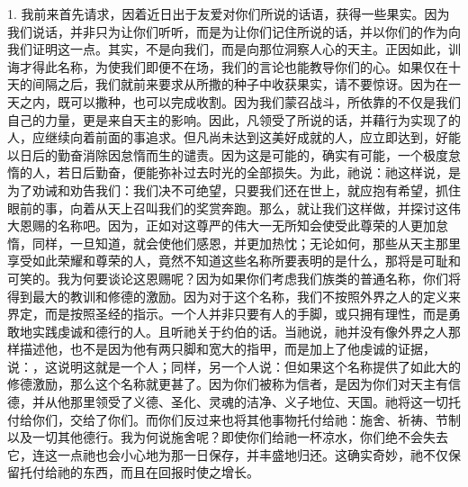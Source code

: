 1. 我前来首先请求，因着近日出于友爱对你们所说的话语，获得一些果实。因为我们说话，并非只为让你们听听，而是为让你们记住所说的话，并以你们的作为向我们证明这一点。其实，不是向我们，而是向那位洞察人心的天主。正因如此，训诲才得此名称，为使我们即便不在场，我们的言论也能教导你们的心。如果仅在十天的间隔之后，我们就前来要求从所撒的种子中收获果实，请不要惊讶。因为在一天之内，既可以撒种，也可以完成收割。因为我们蒙召战斗，所依靠的不仅是我们自己的力量，更是来自天主的影响。因此，凡领受了所说的话，并藉行为实现了的人，应继续向着前面的事追求。但凡尚未达到这美好成就的人，应立即达到，好能以日后的勤奋消除因怠惰而生的谴责。因为这是可能的，确实有可能，一个极度怠惰的人，若日后勤奋，便能弥补过去时光的全部损失。为此，祂说：祂这样说，是为了劝诫和劝告我们：我们决不可绝望，只要我们还在世上，就应抱有希望，抓住眼前的事，向着从天上召叫我们的奖赏奔跑。那么，就让我们这样做，并探讨这伟大恩赐的名称吧。因为，正如对这尊严的伟大一无所知会使受此尊荣的人更加怠惰，同样，一旦知道，就会使他们感恩，并更加热忱；无论如何，那些从天主那里享受如此荣耀和尊荣的人，竟然不知道这些名称所要表明的是什么，那将是可耻和可笑的。我为何要谈论这恩赐呢？因为如果你们考虑我们族类的普通名称，你们将得到最大的教训和修德的激励。因为对于这个名称，我们不按照外界之人的定义来界定，而是按照圣经的指示。一个人并非只要有人的手脚，或只拥有理性，而是勇敢地实践虔诚和德行的人。且听祂关于约伯的话。当祂说，祂并没有像外界之人那样描述他，也不是因为他有两只脚和宽大的指甲，而是加上了他虔诚的证据，说：，这说明这就是一个人；同样，另一个人说：但如果这个名称提供了如此大的修德激励，那么这个名称就更甚了。因为你们被称为信者，是因为你们对天主有信德，并从他那里领受了义德、圣化、灵魂的洁净、义子地位、天国。祂将这一切托付给你们，交给了你们。而你们反过来也将其他事物托付给祂：施舍、祈祷、节制以及一切其他德行。我为何说施舍呢？即使你们给祂一杯凉水，你们绝不会失去它，连这一点祂也会小心地为那一日保存，并丰盛地归还。这确实奇妙，祂不仅保留托付给祂的东西，而且在回报时使之增长。\par

